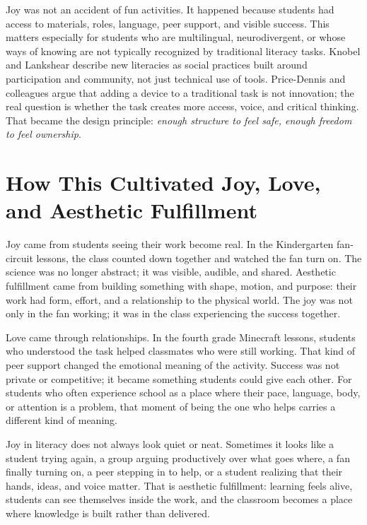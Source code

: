 \documentclass[11pt]{article}
\begin{document}
Joy was not an accident of fun activities. It happened because students had access to materials, roles, language, peer support, and visible success. This matters especially for students who are multilingual, neurodivergent, or whose ways of knowing are not typically recognized by traditional literacy tasks. Knobel and Lankshear describe new literacies as social practices built around participation and community, not just technical use of tools. Price-Dennis and colleagues argue that adding a device to a traditional task is not innovation; the real question is whether the task creates more access, voice, and critical thinking. That became the design principle: \textit{enough structure to feel safe, enough freedom to feel ownership}.

\section*{How This Cultivated Joy, Love, and Aesthetic Fulfillment}

Joy came from students seeing their work become real. In the Kindergarten fan-circuit lessons, the class counted down together and watched the fan turn on. The science was no longer abstract; it was visible, audible, and shared. Aesthetic fulfillment came from building something with shape, motion, and purpose: their work had form, effort, and a relationship to the physical world. The joy was not only in the fan working; it was in the class experiencing the success together.

Love came through relationships. In the fourth grade Minecraft lessons, students who understood the task helped classmates who were still working. That kind of peer support changed the emotional meaning of the activity. Success was not private or competitive; it became something students could give each other. For students who often experience school as a place where their pace, language, body, or attention is a problem, that moment of being the one who helps carries a different kind of meaning.

Joy in literacy does not always look quiet or neat. Sometimes it looks like a student trying again, a group arguing productively over what goes where, a fan finally turning on, a peer stepping in to help, or a student realizing that their hands, ideas, and voice matter. That is aesthetic fulfillment: learning feels alive, students can see themselves inside the work, and the classroom becomes a place where knowledge is built rather than delivered.
\end{document}
